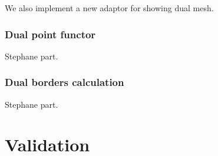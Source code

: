 \documentclass{InsightArticle}
\begin{document}
We also implement a new adaptor for showing dual mesh.
\subsubsection{Dual point functor}
Stephane part.
\subsubsection{Dual borders calculation}
Stephane part.
\section{Validation}
\end{document}
